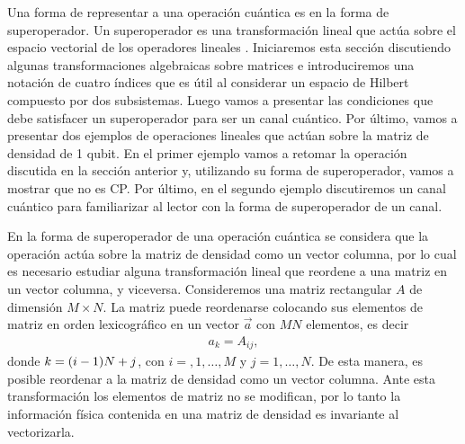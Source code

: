 Una forma de representar a una operación cuántica es en la forma de 
superoperador. Un superoperador es una transformación lineal
que actúa sobre el espacio vectorial de los operadores lineales 
\cite{preskill1998lecture}. 
Iniciaremos esta sección discutiendo algunas
transformaciones algebraicas sobre matrices e introduciremos 
una notación de cuatro índices que es útil al considerar un espacio de Hilbert 
compuesto por dos subsistemas. Luego vamos a presentar 
las condiciones que debe satisfacer un superoperador para ser un 
canal cuántico. Por último, vamos a presentar dos ejemplos de operaciones
lineales que actúan sobre la matriz de densidad de 1 qubit. En el primer 
ejemplo vamos a retomar la operación discutida en la sección anterior y, 
utilizando su forma de superoperador, vamos a mostrar que no es CP. 
Por último, en el segundo ejemplo discutiremos un canal cuántico
para familiarizar al lector con la forma de superoperador de un canal.

En la forma de superoperador de una operación cuántica se 
considera que la operación actúa sobre la matriz de densidad 
como un vector columna, por lo cual es necesario estudiar alguna transformación
lineal que reordene a una matriz en un vector columna, y viceversa.
Consideremos una matriz rectangular $A$ de dimensión $M\times N$.
La matriz puede reordenarse colocando sus elementos de matriz en 
orden lexicográfico en un vector $\vec{a}$ con $MN$ elementos, es decir
\begin{align}
a_k=A_{ij}, 
\label{eq:matrix-to-vector}
\end{align}
donde $k=\qty(i-1)N+j$, con $i=,1,\ldots,M$ y $j=1,\ldots,N$. De
esta manera, es posible reordenar a la matriz de densidad como un 
vector columna. Ante esta transformación los elementos de matriz no se 
modifican, por lo tanto la información física contenida en una matriz 
de densidad es invariante al vectorizarla.

